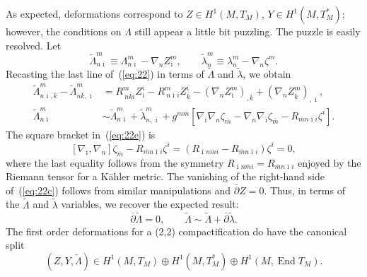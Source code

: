 \documentclass[11pt, a4paper]{article}
\def\CO#1#2{{[#1,#2]}}
\def\End{\operatorname{End}}
\def\pb{\bar{\partial}}
\newcommand\lambdat{\widetilde{\lambda}}
\newcommand\Lambdat{\widetilde{\Lambda}}
\newcommand\ib{\overline{\imath}}
\newcommand\kb{\overline{k}}
\newcommand\mb{\overline{m}}
\begin{document}
As expected, deformations correspond to 
$Z \in H^1(M, T_M)$, $Y\in H^1(M,T^\ast_M)$; however, the conditions
on $\Lambda$ still appear a little bit puzzling.  The puzzle is easily resolved.
Let
$$ \Lambdat^m_{n\ib} \equiv \Lambda^m_{n\ib} - \nabla_n Z^m_{\ib}, \qquad
\lambdat^m_n \equiv \lambda^m_n - \nabla_n \zeta^m.$$
Recasting the last line of~(\ref{eq:22}) in terms of $\Lambdat$ and $\lambdat$,
we obtain
\begin{align}
\label{eq:22c}
\Lambdat^m_{n\ib,\kb}-\Lambdat^m_{n\kb,\ib} & = 
R^m_{~n\kb i} Z^i_{\ib} - R^m_{~n\ib i} Z^i_{\kb}
-(\nabla_n Z^m_{\ib})_{,\kb}
+(\nabla_n Z^m_{\kb})_{,\ib}, \\
\label{eq:22e}
\Lambdat^m_{n\ib} &\sim
\Lambdat^m_{n\ib}  + \lambdat^m_{n,\ib}
+ g^{m\mb} \left[\nabla_{\ib} \nabla_n \zeta_{\mb} -\nabla_n \nabla_{\ib} \zeta_{\mb} -  R_{\mb n\ib i} \zeta^i\right].
\end{align}
The square bracket in~(\ref{eq:22e}) is
$$\CO{\nabla_{\ib}}{\nabla_n} \zeta_{\mb} -R_{\mb n \ib i} \zeta^i
= (R_{\ib n\mb i}-R_{\mb n \ib i} )\zeta^i = 0,$$
where the last equality follows from the symmetry $R_{\ib n\mb i}=R_{\mb n \ib i}$
enjoyed by the Riemann tensor for a K\"ahler metric.  The vanishing of the
right-hand side of~(\ref{eq:22c}) follows from similar manipulations and $\pb Z = 0$.
Thus, in terms of the $\Lambdat$ and $\lambdat$ variables, we recover the
expected result: 
$$ \pb \Lambdat = 0, \qquad \Lambdat \sim \Lambdat + \pb \lambdat.$$
The first order deformations for a (2,2) compactification do have the canonical
split
$$ (Z,Y,\Lambdat)  \in H^1(M,T_M)\oplus H^1(M,T^\ast_M)\oplus H^1(M,\End T_M).$$
\end{document}
